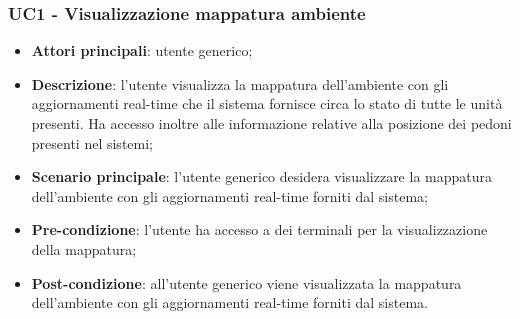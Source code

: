 \subsubsection{UC1 - Visualizzazione mappatura ambiente}
\begin{itemize}
		\item \textbf{Attori principali}: utente generico;
		\item \textbf{Descrizione}: l'utente visualizza la mappatura dell'ambiente con gli aggiornamenti real-time che il sistema fornisce circa lo stato di tutte le unità presenti. Ha accesso inoltre alle informazione relative alla posizione dei pedoni presenti nel sistemi;
		\item \textbf{Scenario principale}: l'utente generico desidera visualizzare la mappatura dell'ambiente con gli aggiornamenti real-time forniti dal sistema; 
		\item \textbf{Pre-condizione}: l'utente ha accesso a dei terminali per la visualizzazione della mappatura;
		\item \textbf{Post-condizione}: all'utente generico viene visualizzata la mappatura dell'ambiente con gli aggiornamenti real-time forniti dal sistema. 
\end{itemize}